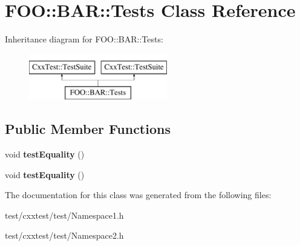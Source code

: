 \hypertarget{classFOO_1_1BAR_1_1Tests}{\section{F\-O\-O\-:\-:B\-A\-R\-:\-:Tests Class Reference}
\label{classFOO_1_1BAR_1_1Tests}
}
Inheritance diagram for F\-O\-O\-:\-:B\-A\-R\-:\-:Tests\-:\begin{figure}[H]
\begin{center}
\leavevmode
\includegraphics[height=2.000000cm]{classFOO_1_1BAR_1_1Tests}
\end{center}
\end{figure}
\subsection*{Public Member Functions}
\begin{DoxyCompactItemize}
\item 
\hypertarget{classFOO_1_1BAR_1_1Tests_af89bb3167b05d5aa6e14895a5688b51c}{void {\bfseries test\-Equality} ()}\label{classFOO_1_1BAR_1_1Tests_af89bb3167b05d5aa6e14895a5688b51c}

\item 
\hypertarget{classFOO_1_1BAR_1_1Tests_af89bb3167b05d5aa6e14895a5688b51c}{void {\bfseries test\-Equality} ()}\label{classFOO_1_1BAR_1_1Tests_af89bb3167b05d5aa6e14895a5688b51c}

\end{DoxyCompactItemize}


The documentation for this class was generated from the following files\-:\begin{DoxyCompactItemize}
\item 
test/cxxtest/test/Namespace1.\-h\item 
test/cxxtest/test/Namespace2.\-h\end{DoxyCompactItemize}
